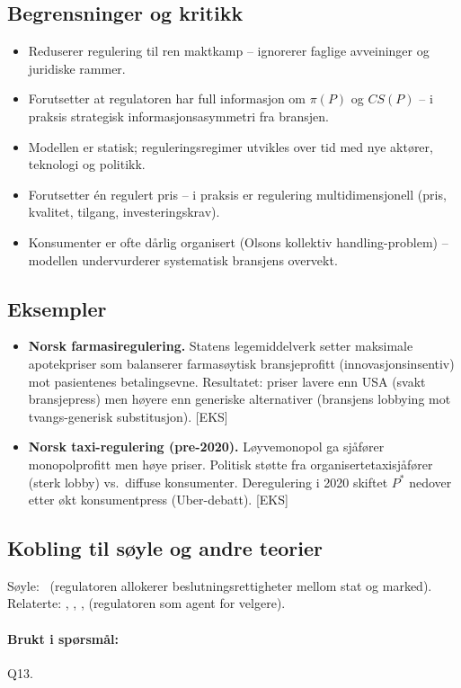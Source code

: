 \subsection*{Begrensninger og kritikk}
\begin{itemize}
\item Reduserer regulering til ren maktkamp -- ignorerer faglige avveininger og juridiske rammer.
\item Forutsetter at regulatoren har full informasjon om $\pi(P)$ og $CS(P)$ -- i praksis strategisk informasjonsasymmetri fra bransjen.
\item Modellen er statisk; reguleringsregimer utvikles over tid med nye aktører, teknologi og politikk.
\item Forutsetter én regulert pris -- i praksis er regulering multidimensjonell (pris, kvalitet, tilgang, investeringskrav).
\item Konsumenter er ofte dårlig organisert (Olsons kollektiv handling-problem) -- modellen undervurderer systematisk bransjens overvekt.
\end{itemize}

\subsection*{Eksempler}
\begin{itemize}\setlength{\itemsep}{2pt}
\item \textbf{Norsk farmasiregulering.} Statens legemiddelverk setter maksimale apotekpriser som balanserer farmasøytisk bransjeprofitt (innovasjonsinsentiv) mot pasientenes betalingsevne. Resultatet: priser lavere enn USA (svakt bransjepress) men høyere enn generiske alternativer (bransjens lobbying mot tvangs-generisk substitusjon). [EKS]
\item \textbf{Norsk taxi-regulering (pre-2020).} Løyvemonopol ga sjåfører monopolprofitt men høye priser. Politisk støtte fra organisertetaxisjåfører (sterk lobby) vs.\ diffuse konsumenter. Deregulering i 2020 skiftet $P^{*}$ nedover etter økt konsumentpress (Uber-debatt). [EKS]
\end{itemize}

\subsection*{Kobling til søyle og andre teorier}
Søyle: \SOne\ (regulatoren allokerer beslutningsrettigheter mellom stat og marked). Relaterte: , , ,  (regulatoren som agent for velgere).

\paragraph{Brukt i spørsmål:} Q13.
